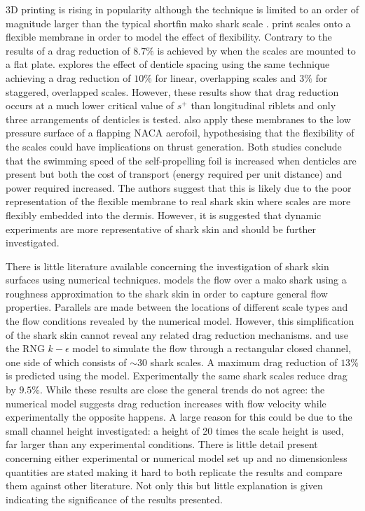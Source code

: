 \documentclass[12pt,oneside,a4paper]{article}
\begin{document}
3D printing is rising in popularity although the technique is limited to an order of magnitude larger than the typical shortfin mako shark scale \citep{lang2008, fletcher2014phd, oeffner2012, wen2014, wen2015}.
\cite{wen2014,wen2015} print scales onto a flexible membrane in order to model the effect of flexibility. Contrary to the results of \citep{bechert1985} a drag reduction of $8.7\%$ is achieved by \cite{wen2014} when the scales are mounted to a flat plate. \cite{wen2015} explores the effect of denticle spacing using the same technique achieving a drag reduction of $10\%$ for linear, overlapping scales and $3\%$ for staggered, overlapped scales. However, these results show that drag reduction occurs at a much lower critical value of $s^+$ than longitudinal riblets and only three arrangements of denticles is tested. \cite{wen2014,wen2015} also apply these membranes to the low pressure surface of a flapping NACA aerofoil, hypothesising that the flexibility of the scales could have implications on thrust generation. Both studies conclude that the swimming speed of the self-propelling foil is increased when denticles are present but both the cost of transport (energy required per unit distance) and power required increased. The authors suggest that this is likely due to the poor representation of the flexible membrane to real shark skin where scales are more flexibly embedded into the dermis. However, it is suggested that dynamic experiments are more representative of shark skin and should be further investigated.

There is little literature available concerning the investigation of shark skin surfaces using numerical techniques. \cite{diez2015} models the flow over a mako shark using a roughness approximation to the shark skin in order to capture general flow properties. Parallels are made between the locations of different scale types and the flow conditions revealed by the numerical model. However, this simplification of the shark skin cannot reveal any related drag reduction mechanisms. \cite{zhang2011a} and \cite{luo2015}  use the RNG $k-\epsilon$ model to simulate the flow through a rectangular closed channel, one side of which consists of $\sim 30$ shark scales. A maximum drag reduction of $13\%$ is predicted using the model. Experimentally the same shark scales reduce drag by $9.5\%$. While these results are close the general trends do not agree: the numerical model suggests drag reduction increases with flow velocity while experimentally the opposite happens. A large reason for this could be due to the small channel height investigated: a height of 20 times the scale height is used, far larger than any experimental conditions. There is little detail present concerning either experimental or numerical model set up and no dimensionless quantities are stated making it hard to both replicate the results and compare them against other literature. Not only this but little explanation is given indicating the significance of the results presented. 
\end{document}
